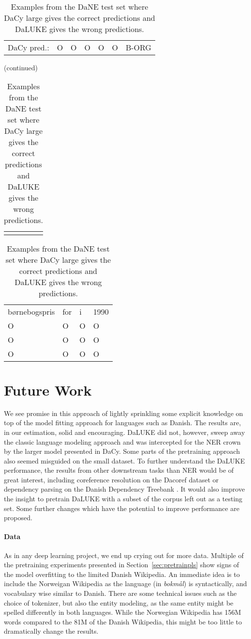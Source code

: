 \documentclass[main.tex]{subfiles}
\begin{document}
\begin{table}[H]
\begin{tabular}{l|llllll}
        DaCy pred.:   & O    & O       & O    & O  & O       & B-ORG
    \end{tabular}
    (continued)\\
    \begin{tabular}{c} %
        \quad \quad \quad \quad \quad \quad \quad \quad \quad \quad \quad
    \end{tabular}
    \begin{tabular}{llll}
        børnebogspris  & for  & i  & 1990  \\
        O              & O    & O  & O     \\\hline
        O              & O    & O  & O     \\
        O              & O    & O  & O
    \end{tabular}
    \caption{
        Examples from the DaNE test set where DaCy large gives the correct predictions and DaLUKE gives the wrong predictions.
    }
    \label{tab:dacyex}
\end{table}\noindent

\section{Future Work}
We see promise in this approach of lightly sprinkling some explicit knowledge on top of the model fitting approach for languages such as Danish.
The results are, in our estimation, solid and encouraging.
DaLUKE did not, however, sweep away the classic language modeling approach and was intercepted for the NER crown by the larger model presented in DaCy.
Some parts of the pretraining approach also seemed misguided on the small dataset.
To further understand the DaLUKE performance, the results from other downstream tasks than NER would be of great interest, including coreference resolution on the Dacoref dataset \cite{kromann2004cdt, danlp2021} or dependency parsing on the Danish Dependency Treebank \cite{kromann2003ddt}.
It would also improve the insight to pretrain DaLUKE with a subset of the corpus left out as a testing set.
Some further changes which have the potential to improve performance are proposed.

\paragraph{Data}
As in any deep learning project, we end up crying out for more data.
Multiple of the pretraining experiments presented in Section~\ref{sec:pretrainpls} show signs of the model overfitting to the limited Danish Wikipedia.
An immediate idea is to include the Norweigan Wikipedia as the language (in \emph{bokmål}) is syntactically, and vocabulary wise similar to Danish.
There are some technical issues such as the choice of tokenizer, but also the entity modeling, as the same entity might be spelled differently in both languages.
While the Norwegian Wikipedia has 156M words \footnotemark compared to the 81M of the Danish Wikipedia, this might be too little to dramatically change the results.
\end{document}
